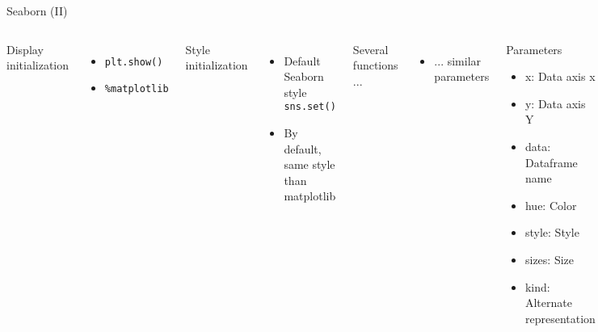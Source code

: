 \documentclass[10pt,compress]{beamer} %
\begin{document}
\begin{frame}[fragile]{Seaborn (II)}
	\begin{columns}
	Display initialization
	\begin{itemize}
		\item \texttt{plt.show()}
		\item \texttt{\%matplotlib}
	\end{itemize}
	Style initialization
	\begin{itemize}
		\item Default Seaborn style \texttt{sns.set()}
		\item By default, same style than matplotlib
	\end{itemize}
	Several functions ...
	\begin{itemize}
		\item ... similar parameters
	\end{itemize}

	\begin{block}{Parameters}
	\begin{itemize}
		\item x: Data axis x
		\item y: Data axis Y
		\item data: Dataframe name
		\item hue: Color
		\item style: Style
		\item sizes: Size
		\item kind: Alternate representation
	\end{itemize}
	\end{block}
	\end{columns}
\end{frame}
\end{document}
